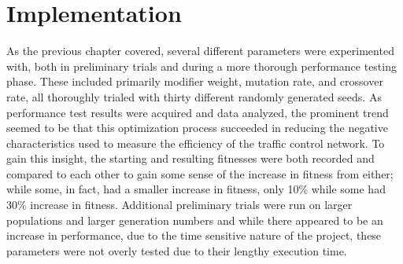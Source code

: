 \chapter{Implementation}\label{ch:implem}

As the previous chapter covered, several different parameters were experimented with, both in preliminary trials and during a more thorough performance testing phase.  These included primarily modifier weight, mutation rate, and crossover rate, all thoroughly trialed with thirty different randomly generated seeds.  As performance test results were acquired and data analyzed, the prominent trend seemed to be that this optimization process succeeded in reducing the negative characteristics used to measure the efficiency of the traffic control network.  To gain this insight, the starting and resulting fitnesses were both recorded and compared to each other to gain some sense of the increase in fitness from either; while some, in fact, had a smaller  increase in fitness, only 10\% while some had 30\% increase in fitness.  Additional preliminary trials were run on larger populations and larger generation numbers and while there appeared to be an increase in performance, due to the time sensitive nature of the project, these parameters were not overly tested due to their lengthy execution time.

